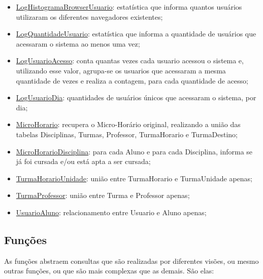 \documentclass[graduacao,brazil]{ThesisPUC}
\begin{document}
\begin{itemize}
	\item \underline{LogHistogramaBrowserUsuario}: estatística que informa quantos usuários utilizaram os diferentes navegadores existentes;
	\item \underline{LogQuantidadeUsuario}: estatística que informa a quantidade de usuários que acessaram o sistema ao menos uma vez;
	\item \underline{LogUsuarioAcesso}: conta quantas vezes cada usuario acessou o sistema e, utilizando esse valor, agrupa-se os usuarios que acessaram a mesma quantidade de vezes e realiza a contagem, para cada quantidade de acesso;
	\item \underline{LogUsuarioDia}: quantidades de usuários únicos que acessaram o sistema, por dia;
	\item \underline{MicroHorario}: recupera o Micro-Horário original, realizando a união das tabelas Disciplinas, Turmas, Professor, TurmaHorario e TurmaDestino;
	\item \underline{MicroHorarioDisciplina}: para cada Aluno e para cada Disciplina, informa se já foi cursada e/ou está apta a ser cursada;
	\item \underline{TurmaHorarioUnidade}: união entre TurmaHorario e TurmaUnidade apenas;
	\item \underline{TurmaProfessor}: união entre Turma e Professor apenas;
	\item \underline{UsuarioAluno}: relacionamento entre Usuario e Aluno apenas;
\end{itemize}

\subsection{Funções}

As funções abstraem consultas que são realizadas por diferentes visões, ou mesmo outras funções, ou que são mais complexas que as demais. São elas:
\end{document}
